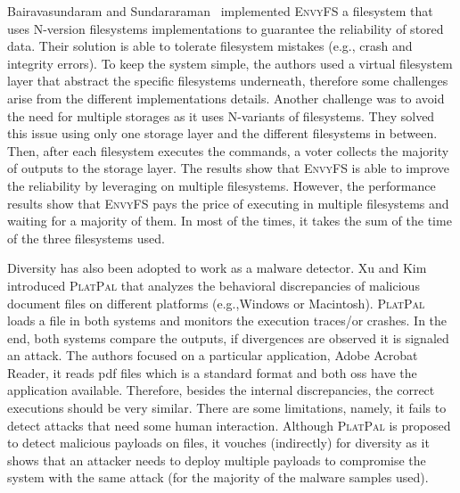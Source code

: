 Bairavasundaram and Sundararaman~\cite{Bairavasundaram:2009} implemented \textsc{EnvyFS} a filesystem that uses N-version filesystems implementations to guarantee the reliability of stored data.
Their solution is able to tolerate filesystem mistakes (e.g., crash and integrity errors). 
To keep the system simple, the authors used a virtual filesystem layer that abstract the specific filesystems underneath, therefore some challenges arise from the different implementations details.
Another challenge was to avoid the need for multiple storages as it uses N-variants of filesystems. 
They solved this issue using only one storage layer and the different filesystems in between. 
Then, after each filesystem executes the commands, a voter collects the majority of outputs to the storage layer.
The results show that \textsc{EnvyFS} is able to improve the reliability by leveraging on multiple filesystems.
However, the performance results show that \textsc{EnvyFS} pays the price of executing in multiple filesystems and waiting for a majority of them. 
In most of the times, it takes the sum of the time of the three filesystems used.

Diversity has also been adopted to work as a malware detector. 
Xu and Kim~\cite{Xu:2017} introduced \textsc{PlatPal} that analyzes the behavioral discrepancies of malicious document files on different platforms (e.g.,Windows or Macintosh). 
\textsc{PlatPal} loads a file in both systems and monitors the execution traces/or crashes. 
In the end, both systems compare the outputs, if divergences are observed it is signaled an attack.
The authors focused on a particular application, Adobe Acrobat Reader, it reads pdf files which is a standard format and both \glspl{os} have the application available.
Therefore, besides the internal discrepancies, the correct executions should be very similar.
There are some limitations, namely, it fails to detect attacks that need some human interaction.
Although \textsc{PlatPal} is proposed to detect malicious payloads on files, it vouches (indirectly) for diversity as it shows that an attacker needs to deploy multiple payloads to compromise the system with the same attack (for the majority of the malware samples used).

